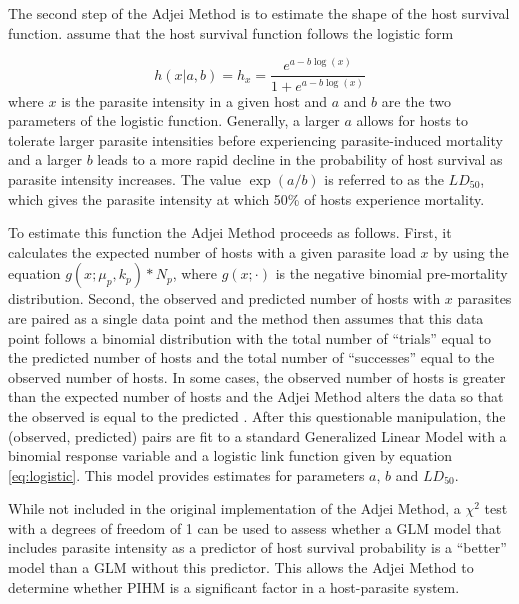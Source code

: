 \documentclass[12pt, a4paper]{article}
\begin{document}
The second step of the Adjei Method is to estimate the shape of the host survival function. \cite{Adjei1986} assume that the host survival function follows the logistic form

\begin{equation}
    h(x | a, b) = h_x = \dfrac{e^{a - b \log(x)}}{1 + e^{a - b \log(x)}}
    \label{eq:logistic}
\end{equation}
where $x$ is the parasite intensity in a given host and $a$ and $b$ are the two
parameters of the logistic function. Generally, a larger $a$ allows for hosts to
tolerate larger parasite intensities before experiencing parasite-induced mortality
and a larger $b$ leads to a more rapid decline in the probability of host
survival as parasite intensity increases.  The value $\exp(a / b)$ is referred
to as the $LD_{50}$, which gives the parasite intensity at which 50\% of hosts
experience mortality.

To estimate this function the Adjei Method proceeds as follows.  First, it
calculates the expected number of hosts with a given parasite load $x$ by using
the equation $g(x ; \mu_p, k_p) * N_p$, where $g(x ; \cdot)$ is the negative binomial pre-mortality distribution.  Second, the observed and predicted number of hosts
with $x$ parasites are paired as a single data point and the method then assumes that
this data point follows a binomial distribution with the total number of
``trials'' equal to the predicted number of hosts and the total number of
``successes'' equal to the observed number of hosts. In some cases, the
observed number of hosts is greater than the expected number of hosts and the
Adjei Method alters the data so that the observed is equal to the predicted
\citep{Adjei1986}.  After this questionable manipulation, the (observed, predicted) pairs are fit to a standard Generalized Linear Model \citep{McCullagh1989} with a binomial response variable and a logistic link function given by equation \ref{eq:logistic}.  This model provides estimates for parameters $a$, $b$ and $LD_{50}$.

While not included in the original implementation of the Adjei Method, a
$\chi^2$ test with a degrees of freedom of 1 can be used to assess whether a GLM model that includes parasite
intensity as a predictor of host survival probability is a ``better'' model than a
GLM without this predictor.  This allows the Adjei Method to determine whether
PIHM is a significant factor in a host-parasite system.
\end{document}

